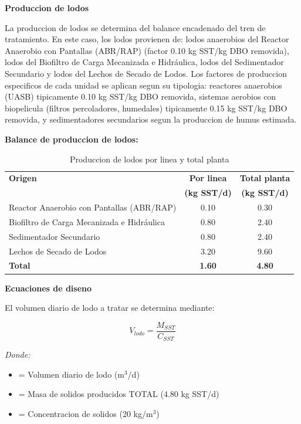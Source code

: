 \documentclass[12pt,a4paper]{article}
\begin{document}
\textbf{Produccion de lodos}

La produccion de lodos se determina del balance encadenado del tren de tratamiento. En este caso, los lodos provienen de: lodos anaerobios del Reactor Anaerobio con Pantallas (ABR/RAP) (factor 0.10 kg SST/kg DBO removida), lodos del Biofiltro de Carga Mecanizada e Hidráulica, lodos del Sedimentador Secundario y lodos del Lechos de Secado de Lodos. Los factores de produccion especificos de cada unidad se aplican segun su tipologia: reactores anaerobios (UASB) tipicamente 0.10 kg SST/kg DBO removida, sistemas aerobios con biopelicula (filtros percoladores, humedales) tipicamente 0.15 kg SST/kg DBO removida, y sedimentadores secundarios segun la produccion de humus estimada.

\textbf{Balance de produccion de lodos:}

\begin{table}[H]
\centering
\small
\caption{Produccion de lodos por linea y total planta}
\begin{tabular}{p{6cm}cc}
\toprule
\textbf{Origen} & \textbf{Por linea} & \textbf{Total planta} \\
 & \textbf{(kg SST/d)} & \textbf{(kg SST/d)} \\
\midrule
Reactor Anaerobio con Pantallas (ABR/RAP) & 0.10 & 0.30 \\
Biofiltro de Carga Mecanizada e Hidráulica & 0.80 & 2.40 \\
Sedimentador Secundario & 0.80 & 2.40 \\
Lechos de Secado de Lodos & 3.20 & 9.60 \\
\midrule
\textbf{Total} & \textbf{1.60} & \textbf{4.80} \\
\bottomrule
\end{tabular}
\end{table}

\textbf{Ecuaciones de diseno}

El volumen diario de lodo a tratar se determina mediante:

\begin{equation}
V_{lodo} = \frac{M_{SST}}{C_{SST}}
\end{equation}

\textit{Donde:}
\begin{itemize}[noitemsep,leftmargin=2em]
    \item[$V_{lodo}$] = Volumen diario de lodo (m$^3$/d)
    \item[$M_{SST}$] = Masa de solidos producidos TOTAL (4.80 kg SST/d)
    \item[$C_{SST}$] = Concentracion de solidos (20 kg/m$^3$)
\end{itemize}
\end{document}
